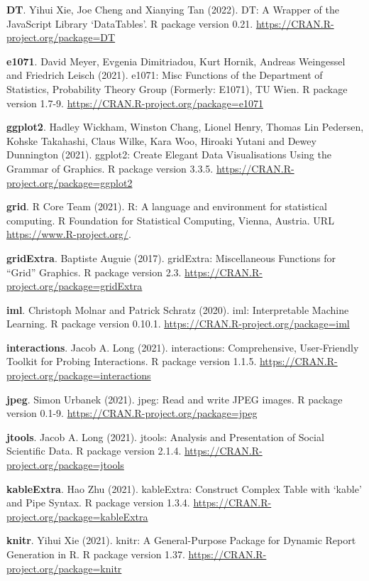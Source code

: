 \documentclass[
  10pt,
]{scrbook}
\begin{document}
\textbf{DT}. Yihui Xie, Joe Cheng and Xianying Tan (2022). DT: A Wrapper of the JavaScript Library `DataTables'. R package version 0.21. \url{https://CRAN.R-project.org/package=DT}

\textbf{e1071}. David Meyer, Evgenia Dimitriadou, Kurt Hornik, Andreas Weingessel and Friedrich Leisch (2021). e1071: Misc Functions of the Department of Statistics, Probability
Theory Group (Formerly: E1071), TU Wien. R package version 1.7-9. \url{https://CRAN.R-project.org/package=e1071}

\textbf{ggplot2}. Hadley Wickham, Winston Chang, Lionel Henry, Thomas Lin Pedersen, Kohske Takahashi, Claus Wilke, Kara Woo, Hiroaki Yutani and Dewey Dunnington (2021). ggplot2: Create Elegant Data Visualisations Using the Grammar of Graphics. R package version 3.3.5. \url{https://CRAN.R-project.org/package=ggplot2}

\textbf{grid}. R Core Team (2021). R: A language and environment for statistical computing. R Foundation for Statistical Computing, Vienna, Austria. URL \url{https://www.R-project.org/}.

\textbf{gridExtra}. Baptiste Auguie (2017). gridExtra: Miscellaneous Functions for ``Grid'' Graphics. R package version 2.3. \url{https://CRAN.R-project.org/package=gridExtra}

\textbf{iml}. Christoph Molnar and Patrick Schratz (2020). iml: Interpretable Machine Learning. R package version 0.10.1. \url{https://CRAN.R-project.org/package=iml}

\textbf{interactions}. Jacob A. Long (2021). interactions: Comprehensive, User-Friendly Toolkit for Probing Interactions. R package version 1.1.5. \url{https://CRAN.R-project.org/package=interactions}

\textbf{jpeg}. Simon Urbanek (2021). jpeg: Read and write JPEG images. R package version 0.1-9. \url{https://CRAN.R-project.org/package=jpeg}

\textbf{jtools}. Jacob A. Long (2021). jtools: Analysis and Presentation of Social Scientific Data. R package version 2.1.4. \url{https://CRAN.R-project.org/package=jtools}

\textbf{kableExtra}. Hao Zhu (2021). kableExtra: Construct Complex Table with `kable' and Pipe Syntax. R package version 1.3.4. \url{https://CRAN.R-project.org/package=kableExtra}

\textbf{knitr}. Yihui Xie (2021). knitr: A General-Purpose Package for Dynamic Report Generation in R. R package version 1.37. \url{https://CRAN.R-project.org/package=knitr}
\end{document}

